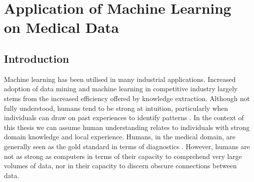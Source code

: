  \chapter{Application of Machine Learning on Medical Data}
  \label{chpt:machine-learning}
    
\section{Introduction}
 
 




Machine learning has been utilised in many industrial applications. Increased adoption of data mining and machine learning in competitive industry largely stems from the increased efficiency offered by knowledge extraction. Although not fully understood, humans tend to be strong at intuition, particularly when individuals can draw on past experiences to identify patterns \cite{okoli2016information,lyneham2008explicating}. In the context of this thesis we can assume human understanding relates to individuals with strong domain knowledge and local experience. Humans, in the medical domain, are generally seen as the gold standard in terms of diagnostics \cite{wang2018trusting}. However, humans are not as strong as computers in terms of their capacity to comprehend very large volumes of data, nor in their capacity to discern obscure connections between data. 
 
